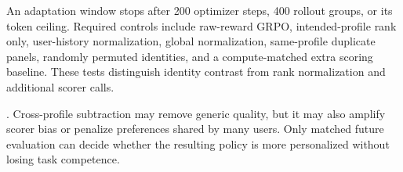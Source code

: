 An adaptation window stops after 200 optimizer steps, 400 rollout groups, or
its token ceiling.  Required controls include raw-reward GRPO, intended-profile
rank only, user-history normalization, global normalization, same-profile
duplicate panels, randomly permuted identities, and a compute-matched extra
scoring baseline.  These tests distinguish identity contrast from rank
normalization and additional scorer calls.

\Evidence.  Cross-profile subtraction may remove generic quality, but it may
also amplify scorer bias or penalize preferences shared by many users.  Only
matched future evaluation can decide whether the resulting policy is more
personalized without losing task competence.
